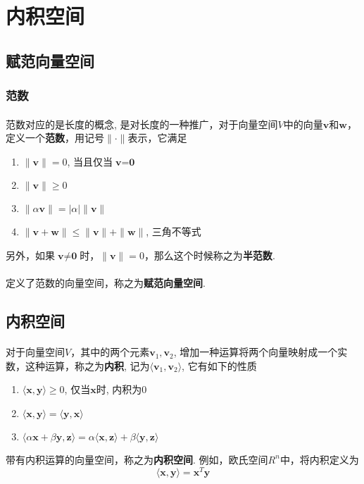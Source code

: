 \section{内积空间}

\subsection{赋范向量空间}
\subsubsection{范数}
\paragraph{}
范数对应的是长度的概念, 是对长度的一种推广，对于向量空间$V$中的向量$\textbf{v}$和$\textbf{w}$，定义一个\textbf{范数}，用记号$\parallel \cdot \parallel$表示，它满足
\begin{enumerate}
\item $\parallel \textbf{v} \parallel = 0$, 当且仅当$\textbf{v} = \textbf{0}$
\item $\parallel \textbf{v} \parallel \geq 0$
\item $\parallel  \alpha \textbf{v} \parallel = |\alpha| \parallel \textbf{v} \parallel$
\item $\parallel \textbf{v} + \textbf{w} \parallel \leq \parallel \textbf{v} \parallel + \parallel \textbf{w} \parallel$, 三角不等式
\end{enumerate}
另外，如果$\textbf{v} \neq \textbf{0}$时，$\parallel \textbf{v} \parallel = 0$，那么这个时候称之为\textbf{半范数}. 

\paragraph{}
定义了范数的向量空间，称之为\textbf{赋范向量空间}.

\subsection{内积空间}
\paragraph{}
对于向量空间$V$，其中的两个元素$\textbf{v}_1, \textbf{v}_2$, 增加一种运算将两个向量映射成一个实数，这种运算，称之为\textbf{内积}, 记为$\langle \textbf{v}_1, \textbf{v}_2 \rangle$, 它有如下的性质
\begin{enumerate}
\item $\langle \textbf{x}, \textbf{y} \rangle \geq 0$, 仅当$\textbf{x}$时, 内积为0
\item $ \langle \textbf{x}, \textbf{y} \rangle = \langle \textbf{y}, \textbf{x} \rangle$
\item $\langle \alpha \textbf{x} + \beta \textbf{y}, \textbf{z} \rangle = \alpha \langle \textbf{x}, \textbf{z} \rangle + \beta \langle \textbf{y}, \textbf{z} \rangle $
\end{enumerate}
带有内积运算的向量空间，称之为\textbf{内积空间}. 例如，欧氏空间$R^n$中，将内积定义为
$$
\langle \textbf{x}, \textbf{y} \rangle = \textbf{x}^T \textbf{y}
$$


